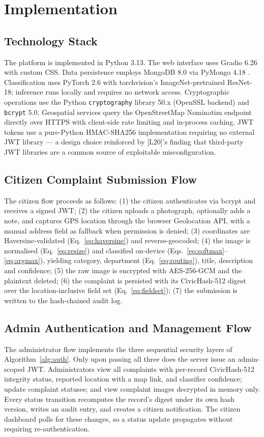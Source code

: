 \documentclass[conference]{IEEEtran}
\begin{document}
\section{Implementation}

\subsection{Technology Stack}
The platform is implemented in Python 3.13. The web interface uses Gradio 6.26 with custom CSS. Data persistence employs MongoDB 8.0 via PyMongo 4.18 \cite{chodorow2013mongodb}. Classification uses PyTorch 2.6 with torchvision's ImageNet-pretrained ResNet-18; inference runs locally and requires no network access. Cryptographic operations use the Python \texttt{cryptography} library 50.x (OpenSSL backend) and \texttt{bcrypt} 5.0. Geospatial services query the OpenStreetMap Nominatim endpoint \cite{haklay2008osm} directly over HTTPS with client-side rate limiting and in-process caching. JWT tokens use a pure-Python HMAC-SHA256 implementation requiring no external JWT library \cite{jones2015jwt} --- a design choice reinforced by [L20]'s finding that third-party JWT libraries are a common source of exploitable misconfiguration.

\subsection{Citizen Complaint Submission Flow}
The citizen flow proceeds as follows: (1) the citizen authenticates via bcrypt and receives a signed JWT; (2) the citizen uploads a photograph, optionally adds a note, and captures GPS location through the browser Geolocation API, with a manual address field as fallback when permission is denied; (3) coordinates are Haversine-validated (Eq.~\ref{eq:haversine}) and reverse-geocoded; (4) the image is normalised (Eq.~\ref{eq:resize}) and classified on-device (Eqs.~\ref{eq:softmax}--\ref{eq:argmax}), yielding category, department (Eq.~\ref{eq:routing}), title, description and confidence; (5) the raw image is encrypted with AES-256-GCM and the plaintext deleted; (6) the complaint is persisted with its CivicHash-512 digest over the location-inclusive field set (Eq.~\ref{eq:fieldset}); (7) the submission is written to the hash-chained audit log.

\subsection{Admin Authentication and Management Flow}
The administrator flow implements the three sequential security layers of Algorithm~\ref{alg:auth}. Only upon passing all three does the server issue an admin-scoped JWT. Administrators view all complaints with per-record CivicHash-512 integrity status, reported location with a map link, and classifier confidence; update complaint statuses; and view complaint images decrypted in memory only. Every status transition recomputes the record's digest under its own hash version, writes an audit entry, and creates a citizen notification. The citizen dashboard polls for these changes, so a status update propagates without requiring re-authentication.
\end{document}
